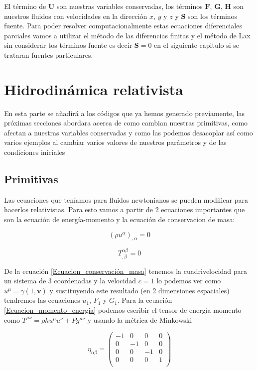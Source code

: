 \documentclass[12pt,a4paper]{book}
\begin{document}
El término de $\mathbf{U}$ son nuestras variables conservadas, los términos $\mathbf{F}$, $\mathbf{G}$, $\mathbf{H}$ son nuestros fluidos  con velocidades en la dirección $x$, $y$ y $z$ y $\mathbf{S}$ son los términos fuente. Para poder resolver computacionalmente estas ecuaciones diferenciales parciales vamos a utilizar el método de las diferencias finitas y el método de Lax sin considerar tos términos fuente es decir $\mathbf{S}=0$ en el siguiente capitulo si se trataran fuentes particulares.

\section{Hidrodinámica relativista}
En esta parte se añadirá a los códigos que ya hemos generado previamente, las próximas secciones abordara acerca de como cambian nuestras primitivas, como afectan a nuestras variables conservadas y como las podemos desacoplar así como varios ejemplos al cambiar varios valores de nuestros parámetros y de las condiciones iniciales

\subsection{Primitivas}
Las ecuaciones que teníamos para fluidos newtonianos se pueden modificar para hacerlos relativistas. Para esto vamos a partir de 2 ecuaciones importantes que son la ecuación de energía-momento y la ecuación de conservacion de masa:

\begin{equation}\label{Ecuacion_conservación_masa}
\left( \rho u^{\alpha} \right)_{, \alpha} =0
\end{equation}

\begin{equation}\label{Ecuacion_momento_energia}
T_{, \beta}^{\alpha \beta}=0
\end{equation}

De la ecuación \ref{Ecuacion_conservación_masa} tenemos la cuadrivelocidad para un sistema de 3 coordenadas y la velocidad $c=1$ lo podemos ver como $u^{\mu}=\gamma \left( 1, \textbf{v}\right)$ y sustituyendo este resultado (en 2 dimensiones espaciales) tendremos las ecuaciones $u_1$, $F_1$ y $G_1$. Para la ecuación \ref{Ecuacion_momento_energia} podemos escribir el tensor de energía-momento como $T^{\mu \nu} = \rho h u^{\mu} u^{\nu} + Pg^{\mu \nu}$ y usando la métrica de Minkowski

\begin{equation}
\eta_{\alpha \beta}= 
\begin{pmatrix}
 -1 & 0 & 0 & 0 \\
 0 & -1 & 0 & 0 \\
 0 & 0 & -1 & 0 \\
 0 & 0 & 0 & 1 \\
\end{pmatrix}
\end{equation}
\end{document}
